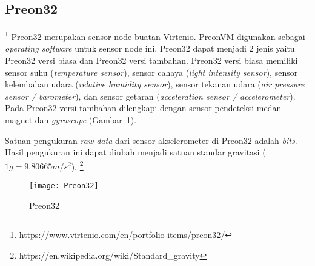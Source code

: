\subsection{Preon32}  \footnote{https://www.virtenio.com/en/portfolio-items/preon32/}
Preon32 merupakan sensor node buatan Virtenio. PreonVM digunakan sebagai {\it operating software} untuk sensor node ini. Preon32 dapat menjadi 2 jenis yaitu Preon32 versi biasa dan Preon32 versi tambahan. Preon32 versi biasa memiliki sensor suhu ({\it temperature sensor}), sensor cahaya ({\it light intensity sensor}), sensor kelembaban udara ({\it relative humidity sensor}), sensor tekanan udara ({\it air pressure sensor / barometer}), dan sensor getaran ({\it acceleration sensor / accelerometer}). Pada Preon32 versi tambahan dilengkapi dengan sensor pendeteksi medan magnet dan {\it gyroscope} (Gambar~\ref{fig:Preon32}). 

Satuan pengukuran {\it raw data} dari sensor akselerometer di Preon32 adalah {\it bits}.  Hasil pengukuran ini dapat diubah menjadi satuan standar gravitasi  ($1g = 9.80665m/s^2$). \footnote{https://en.wikipedia.org/wiki/Standard\_gravity}

\begin{figure} [H]
	\centering  
	\texttt{[image: Preon32]}  
	\caption[Preon32]{Preon32} 
	\label{fig:Preon32} 
\end{figure} 

